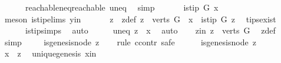 \begin{isabellebody}
\ \ \ \ \ \ reachable{\isacharunderscore}{\kern0pt}neq{\isacharunderscore}{\kern0pt}reachable{}\ uneq\ \isamarkupfalse%
\ simp\isanewline
\ \ \isamarkupfalse%
\ \isamarkupfalse%
\ {\isachardoublequoteopen}{\isasymnot}\ is{\isacharunderscore}{\kern0pt}tip\ G\ x{\isachardoublequoteclose}\isanewline
\ \ \ \ \isamarkupfalse%
\ {\isacharparenleft}{\kern0pt}meson\ is{\isacharunderscore}{\kern0pt}tip{\isachardot}{\kern0pt}elims{\isacharparenleft}{\kern0pt}{}{\isacharparenright}{\kern0pt}\ y{\isacharunderscore}{\kern0pt}in{\isacharparenright}{\kern0pt}\ \isanewline
\ \ \isamarkupfalse%
\ \isamarkupfalse%
\ z\ \ z{\isacharunderscore}{\kern0pt}def{\isacharcolon}{\kern0pt}\ {\isachardoublequoteopen}z\ {\isasymin}\ {\isacharparenleft}{\kern0pt}verts\ G{\isacharparenright}{\kern0pt}\ {\isacharminus}{\kern0pt}\ {\isacharbraceleft}{\kern0pt}x{\isacharbraceright}{\kern0pt}\ {\isasymand}\ is{\isacharunderscore}{\kern0pt}tip\ G\ z{\isachardoublequoteclose}\ \isamarkupfalse%
\ tips{\isacharunderscore}{\kern0pt}exist\isanewline
\ \ \ \ \ \ is{\isacharunderscore}{\kern0pt}tip{\isachardot}{\kern0pt}simps\ \isamarkupfalse%
\ auto\isanewline
\ \ \isamarkupfalse%
\ \isamarkupfalse%
\ uneq{\isacharcolon}{\kern0pt}\ {\isachardoublequoteopen}z\ {\isasymnoteq}\ x{\isachardoublequoteclose}\ \isamarkupfalse%
\ auto\isanewline
\ \ \isamarkupfalse%
\ z{\isacharunderscore}{\kern0pt}in{\isacharcolon}{\kern0pt}\ {\isachardoublequoteopen}z\ {\isasymin}\ verts\ G{\isachardoublequoteclose}\ \isamarkupfalse%
\ z{\isacharunderscore}{\kern0pt}def\ \isamarkupfalse%
\ simp\isanewline
\ \ \isamarkupfalse%
\ {\isachardoublequoteopen}{\isasymnot}\ is{\isacharunderscore}{\kern0pt}genesis{\isacharunderscore}{\kern0pt}node\ z{\isachardoublequoteclose}\isanewline
\ \ \isamarkupfalse%
\ {\isacharparenleft}{\kern0pt}rule\ ccontr{\isacharcomma}{\kern0pt}\ safe{\isacharparenright}{\kern0pt}\isanewline
\ \ \ \ \isamarkupfalse%
\ {\isachardoublequoteopen}is{\isacharunderscore}{\kern0pt}genesis{\isacharunderscore}{\kern0pt}node\ z{\isachardoublequoteclose}\isanewline
\ \ \ \ \isamarkupfalse%
\ \isamarkupfalse%
\ {\isachardoublequoteopen}x\ {\isacharequal}{\kern0pt}\ z{\isachardoublequoteclose}\ \isamarkupfalse%
\ unique{\isacharunderscore}{\kern0pt}genesis\ x{\isacharunderscore}{\kern0pt}in\ \isamarkupfalse%

\end{isabellebody}
